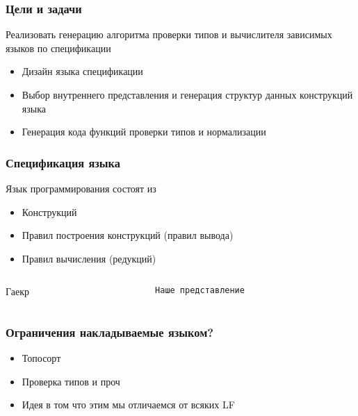 \begin{frame}
\frametitle{Цели и задачи}
Реализовать генерацию алгоритма проверки типов и вычислителя зависимых языков по спецификации

\begin{itemize}
\item Дизайн языка спецификации
\item Выбор внутреннего представления и генерация структур данных конструкций языка
\item Генерация кода функций проверки типов и нормализации
\end{itemize}
\end{frame}
\begin{frame}
\frametitle{Спецификация языка}
Язык программирования состоят из
\begin{itemize}
\item Конструкций
\item Правил построения конструкций (правил вывода)
\item Правил вычисления (редукций)
\end{itemize}
\end{frame}
\begin{frame}[fragile]
\begin{columns}[T] %
\begin{column}{.48\textwidth}

Гаекр

\end{column}%

\hfill%

\begin{column}{.48\textwidth}

\begin{verbatim}
Наше представление
\end{verbatim}

\end{column}%
\end{columns}

\end{frame}
\begin{frame}
\frametitle{Ограничения накладываемые языком?}
\begin{itemize}
\item Топосорт
\item Проверка типов и проч
\item Идея в том что этим мы отличаемся от всяких LF
\end{itemize}
\end{frame}
